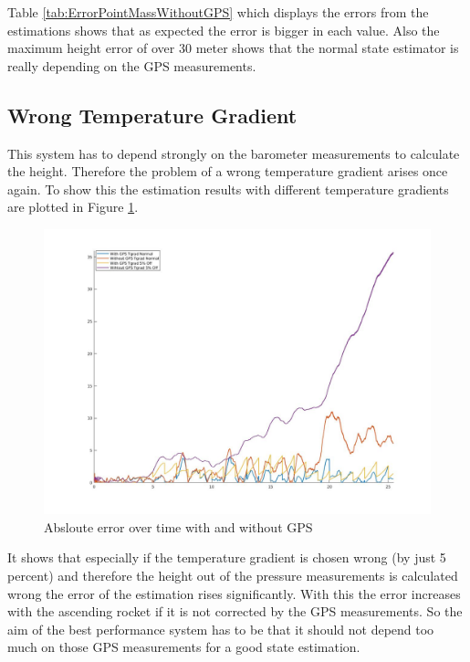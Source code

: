Table \ref{tab:ErrorPointMassWithoutGPS} which displays the errors from the estimations shows that as expected the error is bigger in each value.
Also the maximum height error of over 30 meter shows that the normal state estimator is really depending on the GPS measurements.

\newpage
\subsection{Wrong Temperature Gradient}
This system has to depend strongly on the barometer measurements to calculate the height.
Therefore the problem of a wrong temperature gradient arises once again.
To show this the estimation results with different temperature gradients are plotted in Figure \ref{fig:PointMassWithWithoutGPS}.

\begin{figure}[h!]
 \centering
 \includegraphics[width=.8\textwidth]{./Pictures/PointMassWithWithoutGPS.jpg}
 \caption{Absloute error over time with and without GPS}
 \label{fig:PointMassWithWithoutGPS}
\end{figure}

It shows that especially if the temperature gradient is chosen wrong (by just 5 percent) and
therefore the height out of the pressure measurements is calculated wrong the error of the estimation rises significantly.
With this the error increases with the ascending rocket if it is not corrected by the GPS measurements.
So the aim of the best performance system has to be that it should not depend too much on those GPS measurements for a good state estimation.

